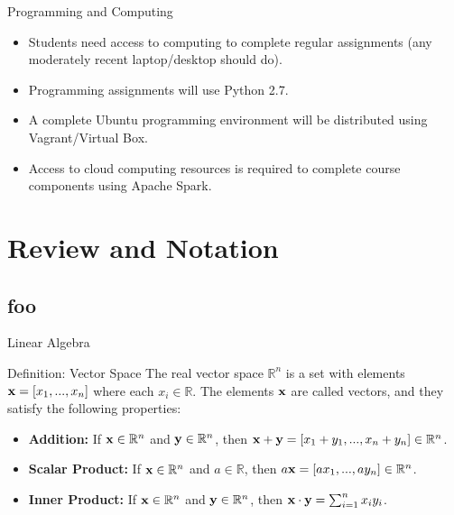 \documentclass[serif,xcolor=pdftex,dvipsnames,table,hyperref={bookmarks=false,breaklinks}]{beamer}
\begin{document}
\begin{frame}[t]{Programming and Computing}

\begin{itemize}[<+->]
\item Students need access to computing to complete regular assignments (any moderately recent laptop/desktop should do).
\item Programming assignments will use Python 2.7.
\item A complete Ubuntu programming environment will be distributed using Vagrant/Virtual Box. 
\item Access to cloud computing resources is required to complete course components using Apache Spark. 
\end{itemize}

\end{frame}

\section{Review and Notation}
\subsection{foo}

\begin{frame}[t]{Linear Algebra}

\begin{block}{Definition: Vector Space}
  The real vector space $\mathbb{R}^n$ is a set with elements  ${\mathbf{x}}=[x_1,...,x_n]$
  where each $x_i \in \mathbb{R}$. The elements ${\mathbf{x}}$ are called vectors, and they satisfy the following properties:
  
  \pause
  \begin{itemize}[<+->]
    \item \textbf{Addition:} If ${\mathbf{x}}\in \mathbb{R}^n$ and ${\mathbf{y}}\in \mathbb{R}^n$, then 
    ${\mathbf{x}} + {\mathbf{y}}=[x_1+y_1,...,x_n+y_n] \in \mathbb{R}^n$.
    \item \textbf{Scalar Product:} If ${\mathbf{x}}\in \mathbb{R}^n$ and $a \in \mathbb{R}$, then 
    $a{\mathbf{x}} =[ax_1,...,ay_n] \in \mathbb{R}^n$.
    \item \textbf{Inner Product:} If ${\mathbf{x}}\in \mathbb{R}^n$ and ${\mathbf{y}}\in \mathbb{R}^n$, then 
    ${\mathbf{x}}\cdot{\mathbf{y}} = \sum_{i=1}^n x_iy_i$.
  \end{itemize}

\end{block}
\end{frame}
\end{document}
